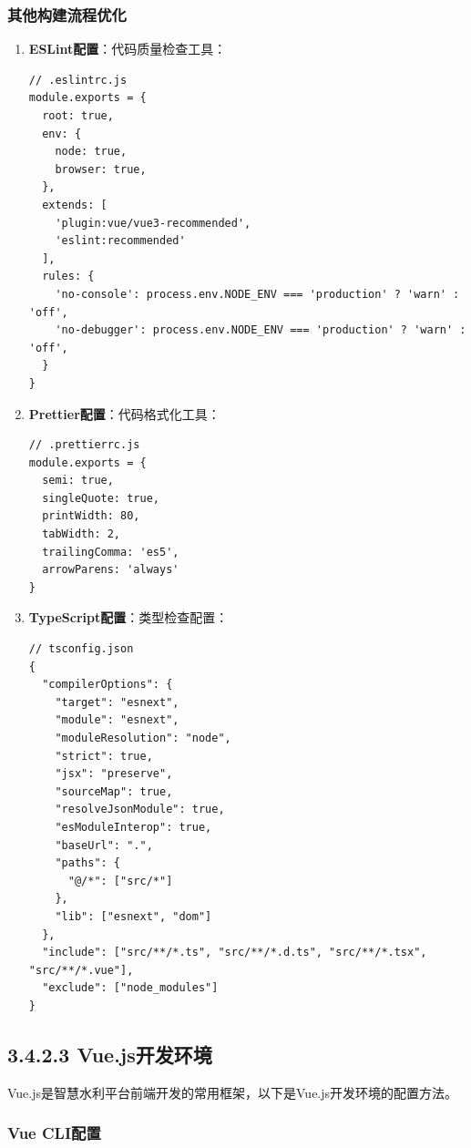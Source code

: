 \subsubsection{其他构建流程优化}\label{ux5176ux4ed6ux6784ux5efaux6d41ux7a0bux4f18ux5316}

\begin{enumerate}
\def\labelenumi{\arabic{enumi}.}
\item
  \textbf{ESLint配置}：代码质量检查工具：

\begin{lstlisting}
// .eslintrc.js
module.exports = {
  root: true,
  env: {
    node: true,
    browser: true,
  },
  extends: [
    'plugin:vue/vue3-recommended',
    'eslint:recommended'
  ],
  rules: {
    'no-console': process.env.NODE_ENV === 'production' ? 'warn' : 'off',
    'no-debugger': process.env.NODE_ENV === 'production' ? 'warn' : 'off',
  }
}
\end{lstlisting}
\item
  \textbf{Prettier配置}：代码格式化工具：

\begin{lstlisting}
// .prettierrc.js
module.exports = {
  semi: true,
  singleQuote: true,
  printWidth: 80,
  tabWidth: 2,
  trailingComma: 'es5',
  arrowParens: 'always'
}
\end{lstlisting}
\item
  \textbf{TypeScript配置}：类型检查配置：

\begin{lstlisting}
// tsconfig.json
{
  "compilerOptions": {
    "target": "esnext",
    "module": "esnext",
    "moduleResolution": "node",
    "strict": true,
    "jsx": "preserve",
    "sourceMap": true,
    "resolveJsonModule": true,
    "esModuleInterop": true,
    "baseUrl": ".",
    "paths": {
      "@/*": ["src/*"]
    },
    "lib": ["esnext", "dom"]
  },
  "include": ["src/**/*.ts", "src/**/*.d.ts", "src/**/*.tsx", "src/**/*.vue"],
  "exclude": ["node_modules"]
}
\end{lstlisting}
\end{enumerate}

\subsection{3.4.2.3
Vue.js开发环境}\label{vue.jsux5f00ux53d1ux73afux5883}

Vue.js是智慧水利平台前端开发的常用框架，以下是Vue.js开发环境的配置方法。

\subsubsection{Vue CLI配置}\label{vue-cliux914dux7f6e}

